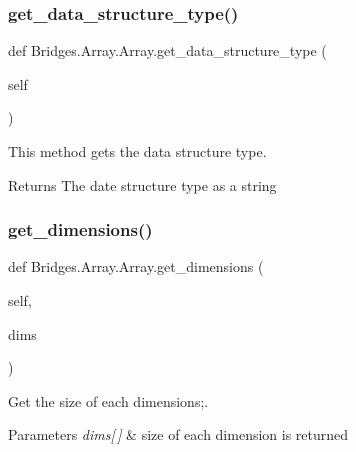 \subsubsection{\texorpdfstring{get\+\_\+data\+\_\+structure\+\_\+type()}{get\_data\_structure\_type()}}
{\footnotesize\ttfamily def Bridges.\+Array.\+Array.\+get\+\_\+data\+\_\+structure\+\_\+type (\begin{DoxyParamCaption}\item[{}]{self }\end{DoxyParamCaption})}



This method gets the data structure type. 

\begin{DoxyReturn}{Returns}
The date structure type as a string 
\end{DoxyReturn}
\mbox{\label{class_bridges_1_1_array_1_1_array_a7ad57c2bd46d18fbff99dd19cd88ba68}} 
\subsubsection{\texorpdfstring{get\+\_\+dimensions()}{get\_dimensions()}}
{\footnotesize\ttfamily def Bridges.\+Array.\+Array.\+get\+\_\+dimensions (\begin{DoxyParamCaption}\item[{}]{self,  }\item[{}]{dims }\end{DoxyParamCaption})}



Get the size of each dimensions;. 


\begin{DoxyParams}{Parameters}
{\em dims\mbox{[}$\,$\mbox{]}} & size of each dimension is returned \\
\hline
\end{DoxyParams}
\mbox{\label{class_bridges_1_1_array_1_1_array_a3bc6a21dcf8792e45e39129044d186db}} 
